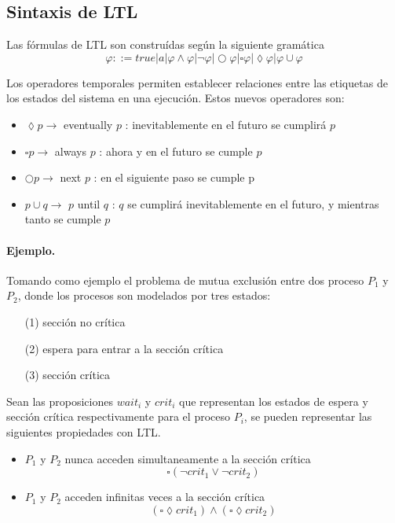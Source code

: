 \subsection{Sintaxis de LTL}

Las fórmulas de LTL son construídas según la siguiente gramática
\[ \varphi ::= true | a | \varphi \wedge \varphi | \lnot \varphi | \bigcirc \varphi | \square \varphi | \lozenge \varphi | \varphi \cup \varphi \]

Los operadores temporales permiten establecer relaciones entre las etiquetas
 de los estados del sistema en una ejecución. Estos nuevos operadores son:

\begin{itemize}

\item $\lozenge p \longrightarrow $ eventually $p$ : 
inevitablemente en el futuro se cumplirá $p$

\item $\square p \longrightarrow $ always $p$ : 
ahora y en el futuro se cumple $p$

\item $\bigcirc p \longrightarrow $ next $p$ : 
en el siguiente paso se cumple p

\item $p \cup q \longrightarrow $ $p$ until $q$ : 
$q$ se cumplirá inevitablemente en el futuro, y mientras tanto se cumple $p$

\end{itemize}


\paragraph{Ejemplo.}
Tomando como ejemplo el problema de mutua exclusión entre dos proceso $P_1$ y $P_2$,
 donde los procesos son modelados por tres estados:
\begin{itemize}
\item[(1)] sección no crítica
\item[(2)] espera para entrar a la sección crítica
\item[(3)] sección crítica
\end{itemize}

Sean las proposiciones $wait_i$ y $crit_i$ que representan los estados de espera y sección crítica
 respectivamente para el proceso $P_i$, se pueden representar las siguientes propiedades con LTL.
\begin{itemize}
\item $P_1$ y $P_2$ nunca acceden simultaneamente a la sección crítica
\[ \square (\neg crit_1 \vee \neg crit_2) \]
\item $P_1$ y $P_2$ acceden infinitas veces a la sección crítica
\[ (\square \lozenge crit_1) \wedge (\square \lozenge crit_2) \]
\end{itemize}


